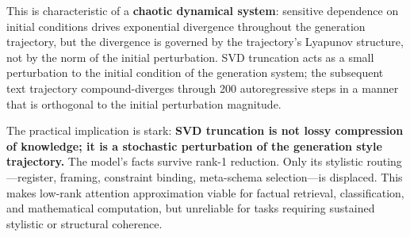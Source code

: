 This is characteristic of a \textbf{chaotic dynamical system}: sensitive dependence on initial
conditions drives exponential divergence throughout the generation trajectory, but the divergence
is governed by the trajectory's Lyapunov structure, not by the norm of the initial perturbation.
SVD truncation acts as a small perturbation to the initial condition of the generation system;
the subsequent text trajectory compound-diverges through 200 autoregressive steps in a manner
that is orthogonal to the initial perturbation magnitude.

The practical implication is stark: \textbf{SVD truncation is not lossy compression of knowledge;
it is a stochastic perturbation of the generation style trajectory.}
The model's facts survive rank-1 reduction.
Only its stylistic routing---register, framing, constraint binding, meta-schema selection---is
displaced. This makes low-rank attention approximation viable for factual retrieval, classification,
and mathematical computation, but unreliable for tasks requiring sustained stylistic or
structural coherence.
